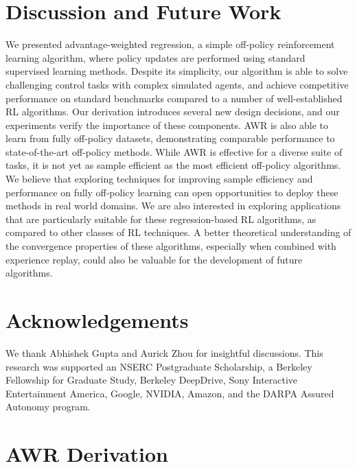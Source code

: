 \documentclass{article} \usepackage{iclr2020_conference,times}
\begin{document}
\section{Discussion and Future Work}
We presented advantage-weighted regression, a simple off-policy reinforcement learning algorithm, where policy updates are performed using standard supervised learning methods. Despite its simplicity, our algorithm is able to solve challenging control tasks with complex simulated agents, and achieve competitive performance on standard benchmarks compared to a number of well-established RL algorithms. Our derivation introduces several new design decisions, and our experiments verify the importance of these components. AWR is also able to learn from fully off-policy datasets, demonstrating comparable performance to state-of-the-art off-policy methods. While AWR is effective for a diverse suite of tasks, it is not yet as sample efficient as the most efficient off-policy algorithms. We believe that exploring techniques for improving sample efficiency and performance on fully off-policy learning can open opportunities to deploy these methods in real world domains. We are also interested in exploring applications that are particularly suitable for these regression-based RL algorithms, as compared to other classes of RL techniques. A better theoretical understanding of the convergence properties of these algorithms, especially when combined with experience replay, could also be valuable for the development of future algorithms.

\section*{Acknowledgements}
We thank Abhishek Gupta and Aurick Zhou for insightful discussions. This research was supported an NSERC Postgraduate Scholarship, a Berkeley Fellowship for Graduate Study, Berkeley DeepDrive, Sony Interactive Entertainment America, Google, NVIDIA, Amazon, and the DARPA Assured Autonomy program.




\newpage

\appendix
\section{AWR Derivation}
\label{app:Derivation}
\end{document}
